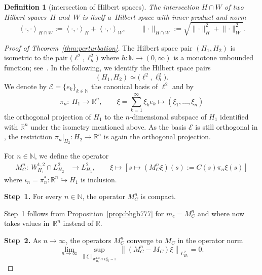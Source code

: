 \documentclass[pdftex]{sigma}
\numberwithin{equation}{section}
\newtheorem{Definition}[Theorem]{Definition}
\newcommand{\N}{{\mathbb{N}}}
\newcommand{\R}{{\mathbb{R}}}
\newcommand{\Ee}{{\mathcal{E}}}
\newcommand{\norm}{{\rm norm}}
\newcommand{\INNER}[2]{\left\langle #1, #2\right\rangle}
\def\norm#1{\mathopen\|#1\mathclose\|}
\def\Norm#1{\left\|#1\right\|}
\newcommand{\INTO}{\hookrightarrow} %
\newcommand{\1}{{{\mathchoice {\rm 1\mskip-4mu l} {\rm 1\mskip-4mu l}
{\rm 1\mskip-4.5mu l} {\rm 1\mskip-5mu l}}}}
\begin{document}
\begin{Definition}[intersection of Hilbert spaces]\label{def:intersection}
The intersection $H\cap W$ of two Hilbert spaces~$H$ and~$W$ is itself
a~Hilbert space with inner product and norm
\[
 \INNER{\cdot}{\cdot}_{H\cap W}
 :=\INNER{\cdot}{\cdot}_H+\INNER{\cdot}{\cdot}_W
 ,
 \qquad
 \norm{\cdot}_{H\cap W}
 :=\sqrt{\norm{\cdot}_H^2+\norm{\cdot}_W^2} .
\]
\end{Definition}

\begin{proof}[Proof of Theorem~\ref{thm:perturbation}]
The Hilbert space pair $(H_1,H_2)$ is isometric to the pair
$\bigl(\ell^2,\ell^2_h\bigr)$ where $h\colon\N\to(0,\infty)$ is a monotone
unbounded function; see~\cite[Theorem~A.4]{Frauenfelder:2024c}.
In the following, we identify the Hilbert space pairs
\[
 (H_1,H_2)\simeq \bigl(\ell^2,\ell^2_h\bigr).
\]
We denote by $\Ee=\{e_k\}_{k\in\N}$ the canonical basis of $\ell^2$
and by
\[
 \pi_n\colon\ H_1\to\R^n
 ,\qquad
 \xi=\sum_{k=1}^\infty \xi_k e_k
 \mapsto \left(\xi_1,\dots,\xi_n\right)
\]
the orthogonal projection of $H_1$ to the $n$-dimensional subspace of
$H_1$ identified with $\R^n$ under the isometry mentioned above.
As the basis $\Ee$ is still orthogonal in ,
the restriction ${\pi_n|_{H_2}\colon H_2\to\R^n}$ is again the
orthogonal projection.

For $n\in\N$, we define the operator
\begin{equation*}
\begin{split}
 M^n_C\colon\ W^{1,2}_{H_1}\cap L^2_{H_2}&\to L^2_{H_1}
 ,\qquad
 \xi\mapsto [s\mapsto
 (M^n_C \xi )(s):=C(s)\pi_n \xi(s) ]
\end{split}
\end{equation*}
where $\iota_n=\pi_n^*\colon\R^n\INTO H_1$ is inclusion.

\medskip

 \noindent
 \textbf{Step~1.}
For every $n\in\N$, the operator $M^n_C$ is compact.

Step~1 follows from Proposition~\ref{prop:bhgb777}
for $m_c=M^n_C$ and where  now takes values
in~$\R^n$ instead of $\R$.

\medskip

 \noindent
\textbf{Step~2.}
As $n\to\infty$, the operators $M^n_C$
converge to $M_C$ in the operator norm
\[
 \lim_{n\to\infty}
 \sup_{\norm{\xi}_{W^{1,2}_{H_1}\cap L^2_{H_2}=1}}
 \Norm{(M^n_C-M_C)\xi}_{L^2_{H_1}}
 =0 .
\]


\end{proof}
\end{document}
